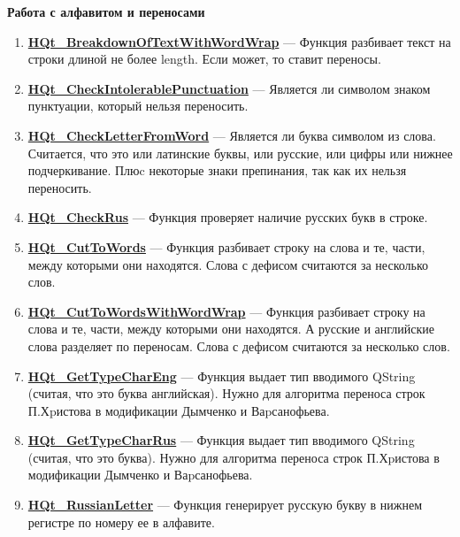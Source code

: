 \documentclass[a4paper,12pt]{article}
\begin{document}
\textbf{Работа с алфавитом и переносами}
\begin{enumerate}

\item \textbf{\hyperref[HQt_BreakdownOfTextWithWordWrap]{HQt\_BreakdownOfTextWithWordWrap}} --- Функция разбивает текст на строки длиной не более length. Если может, то ставит переносы.

\item \textbf{\hyperref[HQt_CheckIntolerablePunctuation]{HQt\_CheckIntolerablePunctuation}} --- Является ли символом знаком пунктуации, который нельзя переносить.

\item \textbf{\hyperref[HQt_CheckLetterFromWord]{HQt\_CheckLetterFromWord}} --- Является ли буква символом из слова. Считается, что это или латинские буквы, или русские, или цифры или нижнее подчеркивание. Плюc некоторые знаки препинания, так как их нельзя переносить.

\item \textbf{\hyperref[HQt_CheckRus]{HQt\_CheckRus}} --- Функция проверяет наличие русских букв в строке.

\item \textbf{\hyperref[HQt_CutToWords]{HQt\_CutToWords}} --- Функция разбивает строку на слова и те, части, между которыми они находятся. Слова с дефисом считаются за несколько слов.

\item \textbf{\hyperref[HQt_CutToWordsWithWordWrap]{HQt\_CutToWordsWithWordWrap}} --- Функция разбивает строку на слова и те, части, между которыми они находятся. А русские и английские слова разделяет по переносам. Слова с дефисом считаются за несколько слов.

\item \textbf{\hyperref[HQt_GetTypeCharEng]{HQt\_GetTypeCharEng}} --- Функция выдает тип вводимого QString (считая, что это буква английская). Нужно для алгоритма переноса строк П.Хpистова в модификации Дымченко и Ваpсанофьева.

\item \textbf{\hyperref[HQt_GetTypeCharRus]{HQt\_GetTypeCharRus}} --- Функция выдает тип вводимого QString (считая, что это буква). Нужно для алгоритма переноса строк П.Хpистова в модификации Дымченко и Ваpсанофьева.

\item \textbf{\hyperref[HQt_RussianLetter]{HQt\_RussianLetter}} --- Функция генерирует русскую букву в нижнем регистре по номеру ее в алфавите.

\end{enumerate}
\end{document}
